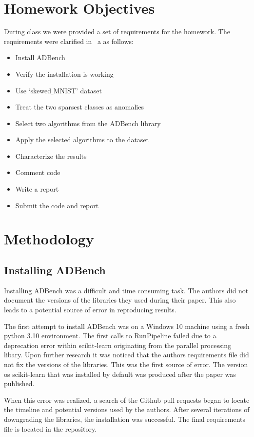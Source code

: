 \section{Homework Objectives}

During class we were provided a set of requirements for the homework. The requirements were clarified in\ \cite{assignment5} a as follows:
\begin{itemize}
    \item Install ADBench
    \item Verify the installation is working
    \item Use `skewed$\_$MNIST' dataset
    \item Treat the two sparsest classes as anomalies
    \item Select two algorithms from the ADBench library
    \item Apply the selected algorithms to the dataset
    \item Characterize the results
    \item Comment code
    \item Write a report
    \item Submit the code and report
\end{itemize}

\section{Methodology}
\subsection{Installing ADBench}
Installing ADBench was a difficult and time consuming task. The authors did not document the versions of the libraries they used during their paper.
This also leads to a potential source of error in reproducing results.\par

The first attempt to install ADBench was on a Windows 10 machine using a fresh python 3.10 environment. The first calls to RunPipeline failed due to 
a deprecation error within scikit-learn originating from the parallel processing libary. Upon further research it was noticed that the authors 
requirements file did not fix the versions of the libraries. This was the first source of error. The version os scikit-learn that was installed
 by default was produced after the paper was published.\par

When this error was realized, a search of the Github pull requests began to locate the timeline and potential versions used by the authors. 
After several iterations of downgrading the libraries, the installation was successful. The final requirements file is located in the repository.\par

